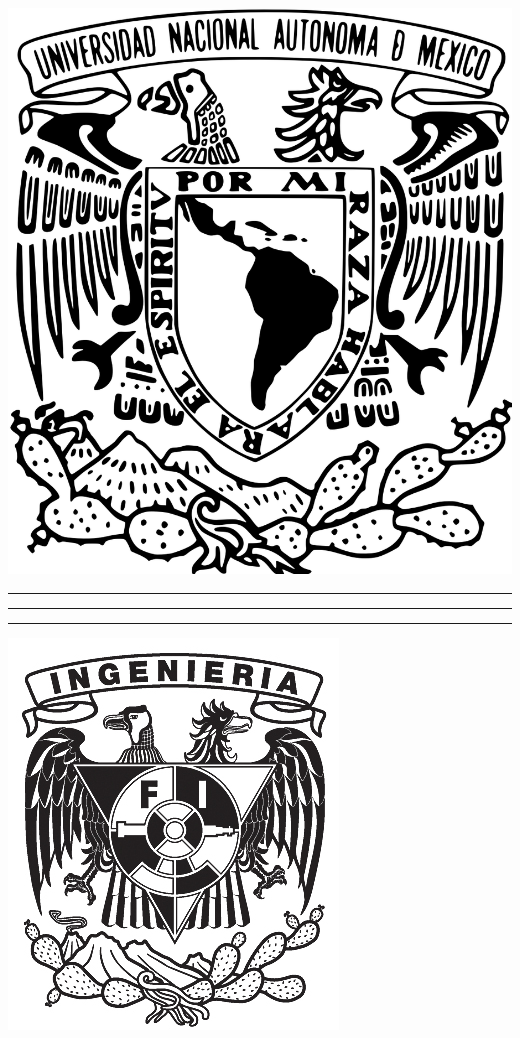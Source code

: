 \documentclass{book}
\begin{document}
	\thispagestyle{empty}
	\frontmatter
	\begin{minipage}{.3\textwidth}
	\begin{flushleft}
		\begin{center}
			{\includegraphics[scale=.35]{Assets/images/escudo_unam.png}}
		\end{center}
		\vspace{10pt}
		\begin{center}{
				\rule{.5pt}{.6\textheight}
				\hspace{7pt}
				\rule{2pt}{.6\textheight}
				\hspace{7pt}
				\rule{.5pt}{.6\textheight}
			}
		\end{center}
		\begin{center}{\includegraphics[scale=1]{Assets/images/escudo_fi.jpg}}\end{center}
	\end{flushleft}
	\end{minipage}
\end{document}
